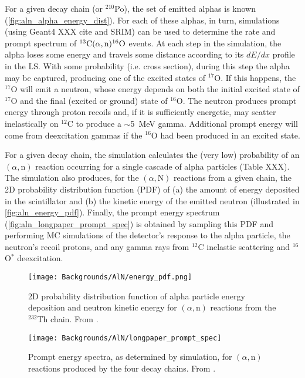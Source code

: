 \documentclass[../thesis.tex]{subfiles}
\begin{document}
For a given decay chain (or $^{210}$Po), the set of emitted alphas is known (\autoref{fig:aln_alpha_energy_dist}). For each of these alphas, in turn, simulations (using Geant4 XXX cite and SRIM) can be used to determine the rate and prompt spectrum of $^{13}\mathrm{C}(\alpha, \mathrm{n})^{16}\mathrm{O}$ events. At each step in the simulation, the alpha loses some energy and travels some distance according to its $dE/dx$ profile in the LS. With some probability (i.e. cross section), during this step the alpha may be captured, producing one of the excited states of $^{17}$O. If this happens, the $^{17}$O will emit a neutron, whose energy depends on both the initial excited state of $^{17}$O and the final (excited or ground) state of $^{16}$O. The neutron produces prompt energy through proton recoils and, if it is sufficiently energetic, may scatter inelastically on $^{12}$C to produce a $\sim$5~MeV gamma. Additional prompt energy will come from deexcitation gammas if the $^{16}$O had been produced in an excited state.

For a given decay chain, the simulation calculates the (very low) probability of an $(\alpha,\mathrm{n})$ reaction occurring for a single cascade of alpha particles (Table XXX). The simulation also produces, for the $(\alpha,\mathrm{N})$ reactions from a given chain, the 2D probability distribution function (PDF) of (a) the amount of energy deposited in the scintillator and (b) the kinetic energy of the emitted neutron (illustrated in \autoref{fig:aln_energy_pdf}). Finally, the prompt energy spectrum (\autoref{fig:aln_longpaper_prompt_spec}) is obtained by sampling this PDF and performing MC simulations of the detector's response to the alpha particle, the neutron's recoil protons, and any gamma rays from $^{12}$C inelastic scattering and $^{16}$O$^*$ deexcitation.

\begin{figure}[ht]
  \texttt{[image: Backgrounds/AlN/energy\_pdf.png]}
  \caption{2D probability distribution function of alpha particle energy deposition and neutron kinetic energy for $(\alpha,\mathrm{n})$ reactions from the $^{232}$Th chain. From \cite{Zhao_2014}.}
  \label{fig:aln_energy_pdf}
\end{figure}

\begin{figure}[ht]
  \texttt{[image: Backgrounds/AlN/longpaper\_prompt\_spec]}
  \caption{Prompt energy spectra, as determined by simulation, for $(\alpha,\mathrm{n})$ reactions produced by the four decay chains. From \cite{An_2017}.}
  \label{fig:aln_longpaper_prompt_spec}
\end{figure}
\end{document}
